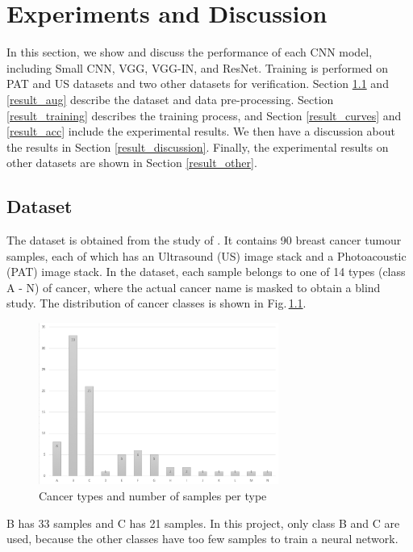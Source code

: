 \chapter{Experiments and Discussion} 
\label{experiments}
In this section, we show and discuss the performance of each CNN model, including Small CNN, VGG, VGG-IN, and ResNet. Training is performed on PAT and US datasets and two other datasets for verification. Section \ref{result_dataset} and \ref{result_aug} describe the dataset and data pre-processing. Section \ref{result_training} describes the training process, and Section \ref{result_curves} and \ref{result_acc} include the experimental results. We then have a discussion about the results in Section \ref{result_discussion}. Finally, the experimental results on other datasets are shown in Section \ref{result_other}.
\section{Dataset}
\label{result_dataset}
The dataset is obtained from the study of \cite{Kosik2019}. It contains 90 breast cancer tumour samples, each of which has an Ultrasound (US) image stack and a Photoacoustic (PAT) image stack. In the dataset, each sample belongs to one of 14 types (class A - N) of cancer, where the actual cancer name is masked to obtain a blind study. The distribution of cancer classes is shown in Fig.\,\ref{class_graph}.  
\begin{figure}[h]
	\centering
	\includegraphics[width=0.7\textwidth]{Figs/class_graph.png}
    \caption{Cancer types and number of samples per type}
    \label{class_graph}
\end{figure}

B has 33 samples and C has 21 samples. In this project, only class B and C are used, because the other classes have too few samples to train a neural network.

